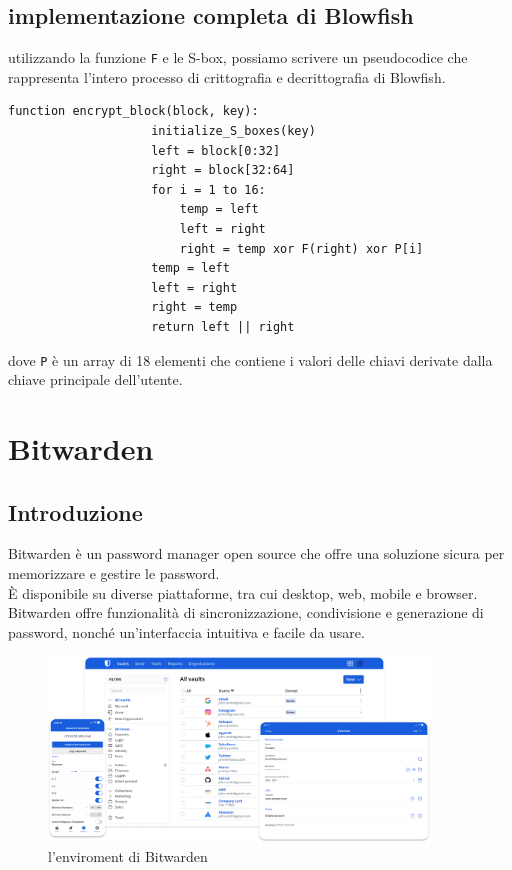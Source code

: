 \documentclass[a4paper,12pt]{report}
\begin{document}
			\section*{implementazione completa di Blowfish}
			utilizzando la funzione \texttt{F} e le S-box, possiamo scrivere un
			pseudocodice che rappresenta l'intero processo di crittografia e
			decrittografia di Blowfish.
			\begin{lstlisting}[style=pseudocode]
				function encrypt_block(block, key):
					initialize_S_boxes(key)
					left = block[0:32]
					right = block[32:64]
					for i = 1 to 16:
						temp = left
						left = right
						right = temp xor F(right) xor P[i]
					temp = left
					left = right
					right = temp
					return left || right
			\end{lstlisting}
			dove \texttt{P} è un array di 18 elementi che contiene i valori delle chiavi
			derivate dalla chiave principale dell'utente.\\
	\chapter{Bitwarden}
		\section{Introduzione}
		Bitwarden è un password manager open source che offre una soluzione sicura
		per memorizzare e gestire le password.\\ È disponibile su diverse piattaforme,
		tra cui desktop, web, mobile e browser. Bitwarden offre funzionalità di
		sincronizzazione, condivisione e generazione di password, nonché un'interfaccia
		intuitiva e facile da usare.\\
		
		\begin{figure}[H]
			\centering
			\includegraphics[width=0.9\textwidth]{wardenEnviroment.png}
			\caption{l'enviroment di Bitwarden}
			\label{fig:eviroment}
		\end{figure}
\end{document}
